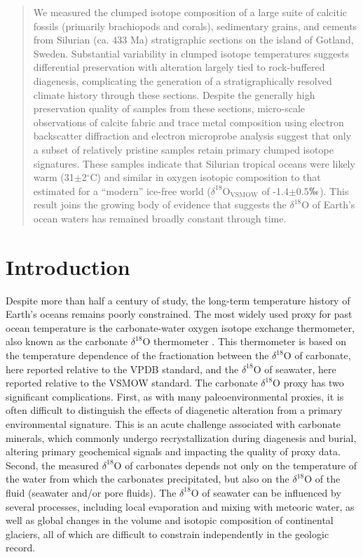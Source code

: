 \documentclass[preprint, authoryear]{elsarticle}
\begin{document}
\begin{frontmatter}
\begin{abstract}
We measured the clumped isotope composition of a large suite of calcitic fossils (primarily brachiopods and corals), sedimentary grains, and cements from Silurian (ca. 433 Ma) stratigraphic sections on the island of Gotland, Sweden. Substantial variability in clumped isotope temperatures suggests differential preservation with alteration largely tied to rock-buffered diagenesis, complicating the generation of a stratigraphically resolved climate history through these sections. Despite the generally high preservation quality of samples from these sections, micro-scale observations of calcite fabric and trace metal composition using electron backscatter diffraction and electron microprobe analysis suggest that only a subset of relatively pristine samples retain primary clumped isotope signatures. These samples indicate that Silurian tropical oceans were likely warm (31$\pm$2$^{\circ}$C) and similar in oxygen isotopic composition to that estimated for a ``modern'' ice-free world ($\delta^{18}$O$_{\text{VSMOW}}$ of -1.4$\pm$0.5$\permil$). This result joins the growing body of evidence that suggests the $\delta^{18}$O of Earth's ocean waters has remained broadly constant through time. 
 
\end{abstract}

\end{frontmatter}

\section{Introduction} 

Despite more than half a century of study, the long-term temperature history of Earth's oceans remains poorly constrained. The most widely used proxy for past ocean temperature is the carbonate-water oxygen isotope exchange thermometer, also known as the carbonate $\delta^{18}$O thermometer \citep{Urey1947}. This thermometer is based on the temperature dependence of the fractionation between the $\delta^{18}$O of carbonate, here reported relative to the VPDB standard, and the $\delta^{18}$O of seawater, here reported relative to the VSMOW standard. The carbonate $\delta^{18}$O proxy has two significant complications. First, as with many paleoenvironmental proxies, it is often difficult to distinguish the effects of diagenetic alteration from a primary environmental signature. This is an acute challenge associated with carbonate minerals, which commonly undergo recrystallization during diagenesis and burial, altering primary geochemical signals and impacting the quality of proxy data. Second, the measured $\delta^{18}$O of carbonates depends not only on the temperature of the water from which the carbonates precipitated, but also on the $\delta^{18}$O of the fluid (seawater and/or pore fluids). The $\delta^{18}$O of seawater can be influenced by several processes, including local evaporation and mixing with meteoric water, as well as global changes in the volume and isotopic composition of continental glaciers, all of which are difficult to constrain independently in the geologic record. 
\end{document}
